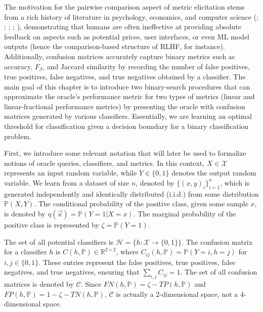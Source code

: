 \documentclass[
  letterpaper,
  numbers=noenddot,
  DIV=11]{scrreprt}
\theoremstyle{definition}
\theoremstyle{plain}
\theoremstyle{plain}
\theoremstyle{remark}
\begin{document}
The motivation for the pairwise comparison aspect of metric elicitation
stems from a rich history of literature in psychology, economics, and
computer science (;
; ; ;
), demonstrating that
humans are often ineffective at providing absolute feedback on aspects
such as potential prices, user interfaces, or even ML model outputs
(hence the comparison-based structure of RLHF, for instance).
Additionally, confusion matrices accurately capture binary metrics such
as accuracy, \(F_\beta\), and Jaccard similarity by recording the number
of false positives, true positives, false negatives, and true negatives
obtained by a classifier. The main goal of this chapter is to introduce
two binary-search procedures that can approximate the oracle's
performance metric for two types of metrics (linear and
linear-fractional performance metrics) by presenting the oracle with
confusion matrices generated by various classifiers. Essentially, we are
learning an optimal threshold for classification given a decision
boundary for a binary classification problem.

First, we introduce some relevant notation that will later be used to
formalize notions of oracle queries, classifiers, and metrics. In this
context, \(X \in \mathcal{X}\) represents an input random variable,
while \(Y \in \{0, 1\}\) denotes the output random variable. We learn
from a dataset of size \(n\), denoted by \(\{(x, y)_i\}^n_{i=1}\), which
is generated independently and identically distributed (i.i.d.) from
some distribution \(\mathbb{P}(X, Y)\). The conditional probability of
the positive class, given some sample \(x\), is denoted by
\(\eta(\vec{x}) = \mathbb{P}(Y=1 | X=x)\). The marginal probability of
the positive class is represented by \(\zeta = \mathbb{P}(Y=1)\).

The set of all potential classifiers is
\(\mathcal{H} = \{h : \mathcal{X} \rightarrow \{0,1\}\}\). The confusion
matrix for a classifier \(h\) is
\(C(h, \mathbb{P}) \in \mathbb{R}^{2 \times 2}\), where
\(C_{ij}(h, \mathbb{P}) = \mathbb{P}(Y=i, h=j)\) for
\(i, j \in \{0,1\}\). These entries represent the false positives, true
positives, false negatives, and true negatives, ensuring that
\(\sum_{i,j}C_{ij}=1\). The set of all confusion matrices is denoted by
\(\mathcal{C}\). Since \(FN(h, \mathbb{P}) = \zeta - TP(h, \mathbb{P})\)
and \(FP(h, \mathbb{P}) = 1 - \zeta - TN(h, \mathbb{P})\),
\(\mathcal{C}\) is actually a 2-dimensional space, not a 4-dimensional
space.
\end{document}
